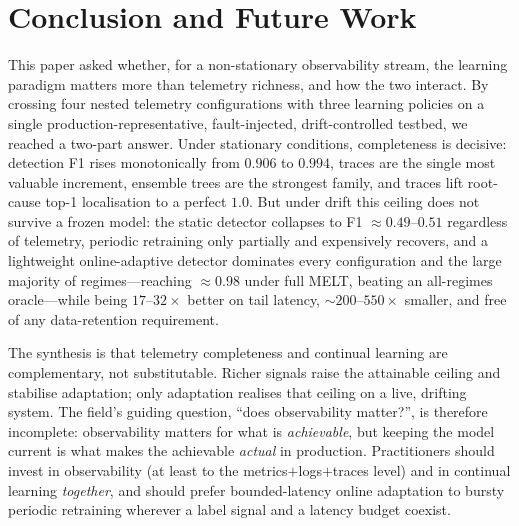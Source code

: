 \documentclass[acmsmall]{acmart}
\begin{document}
\section{Conclusion and Future Work}\label{sec:conclusion}

This paper asked whether, for a non-stationary observability stream, the learning paradigm matters more than telemetry richness, and how the two interact. By crossing four nested telemetry configurations with three learning policies on a single production-representative, fault-injected, drift-controlled testbed, we reached a two-part answer. Under stationary conditions, completeness is decisive: detection F1 rises monotonically from $0.906$ to $0.994$, traces are the single most valuable increment, ensemble trees are the strongest family, and traces lift root-cause top-1 localisation to a perfect $1.0$. But under drift this ceiling does not survive a frozen model: the static detector collapses to F1 $\approx 0.49$--$0.51$ regardless of telemetry, periodic retraining only partially and expensively recovers, and a lightweight online-adaptive detector dominates every configuration and the large majority of regimes---reaching $\approx 0.98$ under full MELT, beating an all-regimes oracle---while being $17$--$32\times$ better on tail latency, $\sim 200$--$550\times$ smaller, and free of any data-retention requirement.

The synthesis is that telemetry completeness and continual learning are complementary, not substitutable. Richer signals raise the attainable ceiling and stabilise adaptation; only adaptation realises that ceiling on a live, drifting system. The field's guiding question, ``does observability matter?'', is therefore incomplete: observability matters for what is \emph{achievable}, but keeping the model current is what makes the achievable \emph{actual} in production. Practitioners should invest in observability (at least to the metrics${+}$logs${+}$traces level) and in continual learning \emph{together}, and should prefer bounded-latency online adaptation to bursty periodic retraining wherever a label signal and a latency budget coexist.
\end{document}
